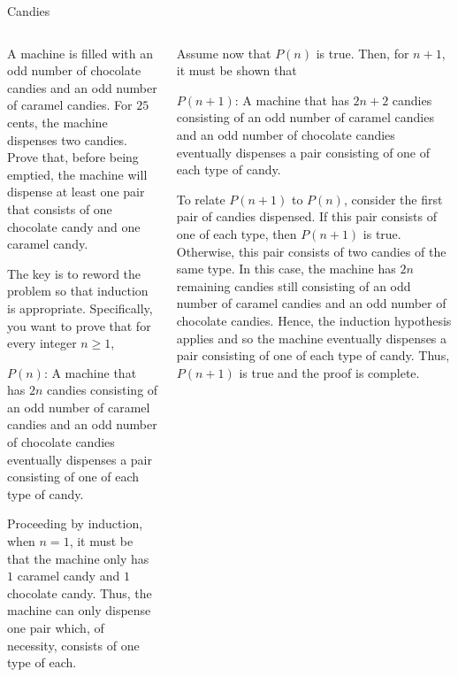 \documentclass[9pt,aspectratio=169,handout]{beamer}
\begin{document}
\begin{frame}{Candies}
  \begin{columns}[T]
    \begin{column}{0.5\textwidth}
      \begin{problem}
        A machine is filled with an odd number of chocolate candies and an odd number of caramel candies. For $25$ cents, the machine dispenses two candies. Prove that, before being emptied, the machine will dispense at least one pair that consists of one chocolate candy and one caramel candy.
      \end{problem}\pause

      The key is to reword the problem so that induction is appropriate. Specifically, you want to prove that for every integer $n \geq 1$,\pause

      \smallskip
      $P(n)$: A machine that has $2n$ candies consisting of an odd number of caramel candies and an odd number of chocolate candies eventually dispenses a pair consisting of one of each type of candy.
      \smallskip\pause

      Proceeding by induction, when $n = 1$, it must be that the machine only has $1$ caramel candy and $1$ chocolate candy. Thus, the machine can only dispense one pair which, of necessity, consists of one type of each.\pause
    \end{column}
    \begin{column}{0.5\textwidth}
      Assume now that $P(n)$ is true. Then, for $n + 1$, it must be shown that
      \smallskip

      $P(n+1)$: A machine that has $2n + 2$ candies consisting of an odd number of caramel candies and an odd number of chocolate candies eventually dispenses a pair consisting of one of each type of candy.
      \smallskip\pause
    
      To relate $P(n + 1)$ to $P(n)$, consider the first pair of candies dispensed. If this pair consists of one of each type, then $P(n + 1)$ is true. Otherwise, this pair consists of two candies of the same type. In this case, the machine has $2n$ remaining candies still consisting of an odd number of caramel candies and an odd number of chocolate candies. Hence, the induction hypothesis applies and so the machine eventually dispenses a pair consisting of one of each type of candy. Thus, $P(n + 1)$ is true and the proof is complete.
    \end{column}
  \end{columns}
\end{frame}
\end{document}
